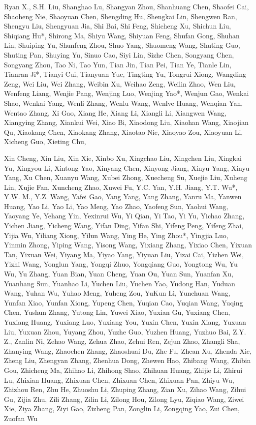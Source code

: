 \documentclass[
  10
]{article}
\begin{document}
Ryan X., S.H. Liu, Shanghao Lu, Shangyan Zhou, Shanhuang Chen, Shaofei
Cai, Shaoheng Nie, Shaoyuan Chen, Shengding Hu, Shengkai Lin, Shengwen
Ran, Shengyu Liu, Shengyuan Jia, Shi Bai, Shi Feng, Shicheng Xu, Shichun
Liu, Shiqiang Hu*, Shirong Ma, Shiyu Wang, Shiyuan Feng, Shufan Gong,
Shuhan Lin, Shuiping Yu, Shunfeng Zhou, Shuo Yang, Shuomeng Wang,
Shuting Guo, Shuting Pan, Shuying Yu, Sinuo Cao, Siyi Lin, Sizhe Chen,
Songyang Chen, Songyang Zhou, Tao Ni, Tao Yun, Tian Jin, Tian Pei, Tian
Ye, Tianle Lin, Tianran Ji*, Tianyi Cui, Tianyuan Yue, Tingting Yu,
Tongrui Xiong, Wangding Zeng, Wei Liu, Wei Zhang, Weibin Xu, Weihao
Zeng, Weilin Zhao, Wen Liu, Wenfeng Liang, Wenjie Pang, Wenjing Luo,
Wenjing Yao*, Wenjun Gao, Wenkai Shao, Wenkai Yang, Wenli Zhang, Wenlu
Wang, Wenlve Huang, Wenqian Yan, Wentao Zhang, Xi Gao, Xiang He, Xiang
Li, Xiangli Li, Xiangwen Wang, Xiangying Zhang, Xiankui Wei, Xiao Bi,
Xiaodong Liu, Xiaohan Wang, Xiaojian Qu, Xiaokang Chen, Xiaokang Zhang,
Xiaotao Nie, Xiaoyao Zou, Xiaoyuan Li, Xicheng Guo, Xieting Chu,



Xin Cheng, Xin Liu, Xin Xie, Xinbo Xu, Xingchao Liu, Xingchen Liu,
Xingkai Yu, Xingyou Li, Xintong Yao, Xinyang Chen, Xinyong Jiang, Xinyu
Yang, Xinyu Yang, Xu Chen, Xuanyu Wang, Xubei Zhong, Xuecheng Su, Xuejie
Liu, Xuheng Lin, Xujie Fan, Xuncheng Zhao, Xuwei Fu, Y.C. Yan, Y.H.
Jiang, Y.T. Wu*, Y.W. M., Y.Z. Wang, Yafei Gao, Yang Yang, Yang Zhang,
Yanru Ma, Yanwen Huang, Yao Li, Yao Li, Yao Meng, Yao Zhao, Yaofeng Sun,
Yaohui Wang, Yaoyang Ye, Yehang Yin, Yexinrui Wu, Yi Qian, Yi Tao, Yi
Yu, Yichao Zhang, Yichen Jiang, Yicheng Wang, Yifan Ding, Yifan Shi,
Yifeng Peng, Yifeng Zhai, Yijia Wu, Yiliang Xiong, Yilun Wang, Ying He,
Ying Zhou*, Yingjia Luo, Yinmin Zhong, Yiping Wang, Yisong Wang, Yixiang
Zhang, Yixiao Chen, Yixuan Tan, Yixuan Wei, Yiyang Ma, Yiyao Yang,
Yiyuan Liu, Yizai Cai, Yizhen Wei, Yizhi Wang, Yonglun Yang, Yongqi
Zhuo, Yongqiang Guo, Yongtong Wu, Yu Wu, Yu Zhang, Yuan Bian, Yuan
Cheng, Yuan Ou, Yuan Sun, Yuanfan Xu, Yuanhang Sun, Yuanhao Li, Yuchen
Liu, Yuchen Yao, Yudong Han, Yuduan Wang, Yuhan Wu, Yuhao Meng, Yuheng
Zou, YuKun Li, Yunchuan Wang, Yunfan Xiao, Yunfan Xiong, Yupeng Chen,
Yuqian Cao, Yuqian Wang, Yuqing Chen, Yushun Zhang, Yutong Lin, Yuwei
Xiao, Yuxian Gu, Yuxiang Chen, Yuxiang Huang, Yuxiang Luo, Yuxiang You,
Yuxin Chen, Yuxin Xiang, Yuxuan Liu, Yuxuan Zhou, Yuyang Zhou, Yuzhe
Guo, Yuzhen Huang, Yuzhuo Bai, Z.Y. Z., Zanlin Ni, Zehao Wang, Zehua
Zhao, Zehui Ren, Zejun Zhao, Zhangli Sha, Zhanying Wang, Zhaochen Zhang,
Zhaoshuai Du, Zhe Fu, Zhean Xu, Zhenda Xie, Zheng Liu, Zhengyan Zhang,
Zhenhua Dong, Zhewen Hao, Zhibang Wang, Zhibin Gou, Zhicheng Ma, Zhihao
Li, Zhihong Shao, Zhihuan Huang, Zhijie Li, Zhirui Lu, Zhixian Huang,
Zhixuan Chen, Zhixuan Chen, Zhixuan Pan, Zhiyu Wu, Zhizhou Ren, Zhu He,
Zhuoshu Li, Zhuping Zhang, Zian Xu, Zihao Wang, Zihui Gu, Zijia Zhu,
Zili Zhang, Zilin Li, Zilong Hou, Zilong Lyu, Ziqiao Wang, Ziwei Xie,
Ziya Zhang, Ziyi Gao, Zizheng Pan, Zonglin Li, Zongqing Yao, Zui Chen,
Zuofan Wu
\end{document}
